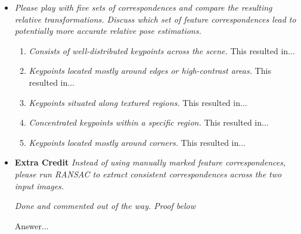 \documentclass[11pt]{article}
\begin{document}
\begin{itemize}
        \item \textit{Please play with five sets of correspondences and compare the resulting relative
        transformations. Discuss which set of feature correspondences lead to potentially more accurate relative pose
        estimations.}\newline
        \begin{enumerate}
            \item \textit{Consists of well-distributed keypoints across the scene.}\newline
            This resulted in$\ldots$\newline

            \item \textit{Keypoints located mostly around edges or high-contrast areas.}\newline
            This resulted in$\ldots$\newline

            \item \textit{Keypoints situated along textured regions.}\newline
            This resulted in$\ldots$\newline

            \item \textit{Concentrated keypoints within a specific region.}\newline
            This resulted in$\ldots$\newline

            \item \textit{Keypoints located mostly around corners.}\newline
            This resulted in$\ldots$\newline
        \end{enumerate}

        \item \textbf{Extra Credit} \textit{Instead of using manually marked feature correspondences, please run
        RANSAC to extract consistent correspondences across the two input images.}
        \par
        \textit{\textemdash Done and commented out of the way. Proof below}
        \par
        Answer$\ldots$\newline
    \end{itemize}
\end{document}
